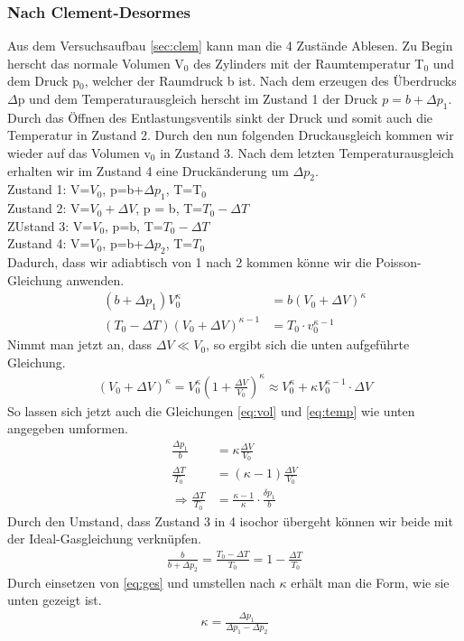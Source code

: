 \documentclass[12pt,a4paper,titlepage,headinclude,bibtotoc]{scrartcl}
\begin{document}
\subsubsection{Nach Clement-Desormes}
Aus dem Versuchsaufbau \ref{sec:clem} kann man die 4 Zustände Ablesen.
Zu Begin herscht das normale Volumen V$_0$ des Zylinders mit der Raumtemperatur T$_0$ und dem Druck p$_0$, welcher der Raumdruck b ist.
Nach dem erzeugen des Überdrucks $\Delta$p und dem Temperaturausgleich herscht im Zustand 1 der Druck $p=b+\Delta p_1$.
Durch das Öffnen des Entlastungsventils sinkt der Druck und somit auch die Temperatur in Zustand 2.
Durch den nun folgenden Druckausgleich kommen wir wieder auf das Volumen v$_0$ in Zustand 3.
Nach dem letzten Temperaturausgleich erhalten wir im Zustand 4 eine Druckänderung um $\Delta p_2$.\\
Zustand 1: V=$V_0$, p=b+$\Delta p_1$, T=T$_0$\\
Zustand 2: V=$V_0+\Delta V$, p = b, T=$T_0-\Delta T$\\
ZUstand 3: V=$V_0$, p=b, T=$T_0-\Delta T$\\
Zustand 4: V=$V_0$, p=b+$\Delta p_2$, T=$T_0$\\

Dadurch, dass wir adiabtisch von 1 nach 2 kommen könne wir die Poisson-Gleichung anwenden.
\begin{align}
	(b+\Delta p_1)V_0^\kappa &= b(V_0 + \Delta V)^\kappa\label{eq:vol}\\
	(T_0-\Delta T)(V_0+\Delta V)^{\kappa-1}&=T_0\cdot v_0^{\kappa-1}\label{eq:temp}
\end{align}
Nimmt man jetzt an, dass $\Delta V \ll V_0$, so ergibt sich die unten aufgeführte Gleichung.
\begin{align}
	(V_0+\Delta V)^\kappa=V_0^\kappa\left(1+\frac{\Delta V}{V_0}\right)^\kappa \approx V_0^\kappa+\kappa V_0^{\kappa-1}\cdot \Delta V
\end{align}
So lassen sich jetzt auch die Gleichungen \eqref{eq:vol} und \eqref{eq:temp} wie unten angegeben umformen.
\begin{align}
	\frac{\Delta p_1}{b}&=\kappa\frac{\Delta V}{V_0}\\
	\frac{\Delta T}{T_0}&=(\kappa-1)\frac{\Delta V}{V_0}\\
	\Rightarrow \frac{\Delta T}{T_0}&=\frac{\kappa -1}{\kappa}\cdot\frac{\delta p_1}{b}\label{eq:ges}
\end{align}
Durch den Umstand, dass Zustand 3 in 4 isochor übergeht können wir beide mit der Ideal-Gasgleichung verknüpfen.
\begin{align}
	\frac{b}{b+\Delta p_2}=\frac{T_0-\Delta T}{T_0}=1-\frac{\Delta T}{T_0}
\end{align}
Durch einsetzen von \eqref{eq:ges} und umstellen nach $\kappa$ erhält man die Form, wie sie unten gezeigt ist.
\begin{align}
	\kappa=\frac{\Delta p_1}{\Delta p_1-\Delta p_2}\label{eq:clem}
\end{align}
\end{document}
